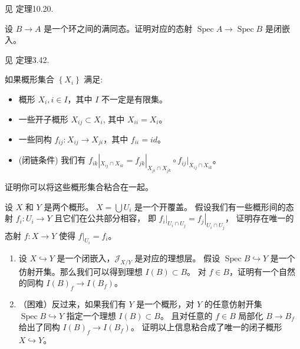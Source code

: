 见\cite{GoWe20} 定理10.20.

\begin{exercise}[闭嵌入]
    设 $B \rightarrow A$ 是一个环之间的满同态。证明对应的态射 $\operatorname{Spec} A \rightarrow \operatorname{Spec} B$ 是闭嵌入。
\end{exercise}

见\cite{GoWe20} 定理3.42.

\begin{exercise}[粘合概形]
    如果概形集合 $\left\{X_{i}\right\}$ 满足:
    \begin{itemize}
        \item 概形 $X_{i}, i \in I$，其中 $I$ 不一定是有限集。
        \item 一些开子概形 $X_{i j} \subset X_{i}$, 其中 $X_{i i}=X_{i}$。
        \item 一些同构 $f_{i j}: X_{i j} \rightarrow X_{j i}$，其中 $f_{i i}=i d$。
        \item (闭链条件) 我们有 $f_{i k}|_{X_{i j} \cap X_{i k}}
        =f_{j k}|_{X_{j i} \cap X_{j k}} \circ f_{i j}|_{X_{i j} \cap X_{i k}}$。
    \end{itemize}
    证明你可以将这些概形集合粘合在一起。
\end{exercise}

\begin{exercise}[粘合态射]
    设 $X$ 和 $Y$ 是两个概形。 $X=\bigcup U_{i}$ 是一个开覆盖。
    假设我们有一些概形间的态射 $f_{i}: U_{i} \rightarrow Y$ 且它们在公共部分相容，
    即 $\left.f_{i}\right|_{U_{i} \cap U_{j}}=\left.f_{j}\right|_{U_{i} \cap U_{j}}$，
    证明存在唯一的态射 $f: X \rightarrow Y$ 使得 $\left.f\right|_{U_{i}}=f_{i}$。
\end{exercise}

\begin{exercise}[闭嵌入对应的理想层]
    \begin{enumerate}
        \item 设 $X \hookrightarrow Y$ 是一个闭嵌入，$\mathcal{J}_{X / Y}$ 是对应的理想层。
        假设 $\operatorname{Spec} B \hookrightarrow Y$ 是一个仿射开集。那么我们可以得到理想 $I(B) \subset B$。
        对 $f \in B$，证明有一个自然的同构 $I(B)_{f} \rightarrow I(B_{f})$。
        \item（困难）反过来，如果我们有 $Y$ 是一个概形，对 $Y$ 的任意仿射开集 $\operatorname{Spec} B \hookrightarrow Y$ 指定一个理想 $I(B) \subset B$。
        且对任意的 $f \in B$ 局部化 $B \rightarrow B_{f}$ 给出了同构 $I(B)_{f} \rightarrow I(B_{f})$。
        证明以上信息粘合成了唯一的闭子概形 $X \hookrightarrow Y$。
    \end{enumerate}
\end{exercise}

